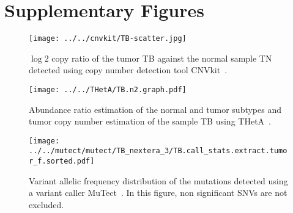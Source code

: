 \documentclass{article}
\begin{document}
\section{Supplementary Figures}
\begin{figure}[H]
\begin{center}
  \texttt{[image: ../../cnvkit/TB-scatter.jpg]}
 \caption{$\log2$ copy ratio of the tumor TB against the normal sample TN detected using copy number detection tool CNVkit~\cite{talevich2016cnvkit}.}
 \label{log2_cn}
\end{center}
\end{figure}

\begin{figure}[H]
\begin{center}
   \texttt{[image: ../../THetA/TB.n2.graph.pdf]}
 \caption{Abundance ratio estimation of the normal and tumor subtypes and tumor copy number estimation of the sample TB using THetA~\cite{oesper2013inferring}.}
 \label{theta_result}
\end{center}
\end{figure}

\begin{figure}[H]
\begin{center}
 \texttt{[image: ../../mutect/mutect/TB\_nextera\_3/TB.call\_stats.extract.tumor\_f.sorted.pdf]}
 \caption{Variant allelic frequency distribution of the mutations detected using a variant caller MuTect~\cite{cibulskis2013sensitive}. In this figure, non significant SNVs are not excluded.}
\end{center}
\end{figure}
\end{document}
